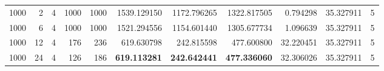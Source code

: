\begin{table}
\begin{tabular}{rrrrrrrrrrr}
1000 & 2 & 4 & 1000 & 1000 & 1539.129150 & 1172.796265 & 1322.817505 & 0.794298 & 35.327911 & 5 \\
1000 & 6 & 4 & 1000 & 1000 & 1521.294556 & 1154.601440 & 1305.677734 & 1.096639 & 35.327911 & 5 \\
1000 & 12 & 4 & 176 & 236 & 619.630798 & 242.815598 & 477.600800 & 32.220451 & 35.327911 & 5 \\
1000 & 24 & 4 & 126 & 186 & \textbf{619.113281} & \textbf{242.642441} & \textbf{477.336060} & 32.306026 & 35.327911 & 5 \\
\bottomrule
\end{tabular}
\end{table}


